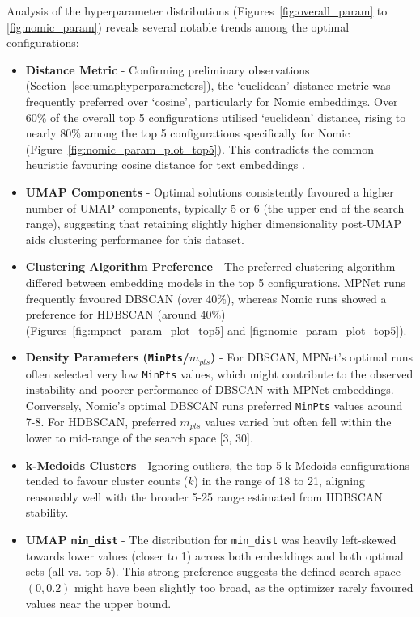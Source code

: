 \documentclass[10pt,oneside]{report}
\begin{document}
Analysis of the hyperparameter distributions (Figures~\ref{fig:overall_param} to \ref{fig:nomic_param}) reveals several notable trends among the optimal configurations:
\begin{itemize}
    \item \textbf{Distance Metric} - Confirming preliminary observations (Section~\ref{sec:umaphyperparameters}), the `euclidean' distance metric was frequently preferred over `cosine', particularly for Nomic embeddings. Over 60\% of the overall top 5 configurations utilised `euclidean' distance, rising to nearly 80\% among the top 5 configurations specifically for Nomic (Figure~\ref{fig:nomic_param_plot_top5}). This contradicts the common heuristic favouring cosine distance for text embeddings \cite{baba2017plagiarism, cao2024recent}.
    \item \textbf{UMAP Components} - Optimal solutions consistently favoured a higher number of UMAP components, typically 5 or 6 (the upper end of the search range), suggesting that retaining slightly higher dimensionality post-UMAP aids clustering performance for this dataset.
    \item \textbf{Clustering Algorithm Preference} - The preferred clustering algorithm differed between embedding models in the top 5 configurations. MPNet runs frequently favoured DBSCAN (over 40\%), whereas Nomic runs showed a preference for HDBSCAN (around 40\%) (Figures~\ref{fig:mpnet_param_plot_top5} and \ref{fig:nomic_param_plot_top5}).
    \item \textbf{Density Parameters (\texttt{MinPts}/$m_{pts}$)} - For DBSCAN, MPNet's optimal runs often selected very low \texttt{MinPts} values, which might contribute to the observed instability and poorer performance of DBSCAN with MPNet embeddings. Conversely, Nomic's optimal DBSCAN runs preferred \texttt{MinPts} values around 7-8. For HDBSCAN, preferred $m_{pts}$ values varied but often fell within the lower to mid-range of the search space [3, 30].
    \item \textbf{k-Medoids Clusters} - Ignoring outliers, the top 5 k-Medoids configurations tended to favour cluster counts ($k$) in the range of 18 to 21, aligning reasonably well with the broader 5-25 range estimated from HDBSCAN stability.
    \item \textbf{UMAP \texttt{min\_dist}} - The distribution for \texttt{min\_dist} was heavily left-skewed towards lower values (closer to 1) across both embeddings and both optimal sets (all vs. top 5). This strong preference suggests the defined search space $(0, 0.2)$ might have been slightly too broad, as the optimizer rarely favoured values near the upper bound.
\end{itemize}
\end{document}
